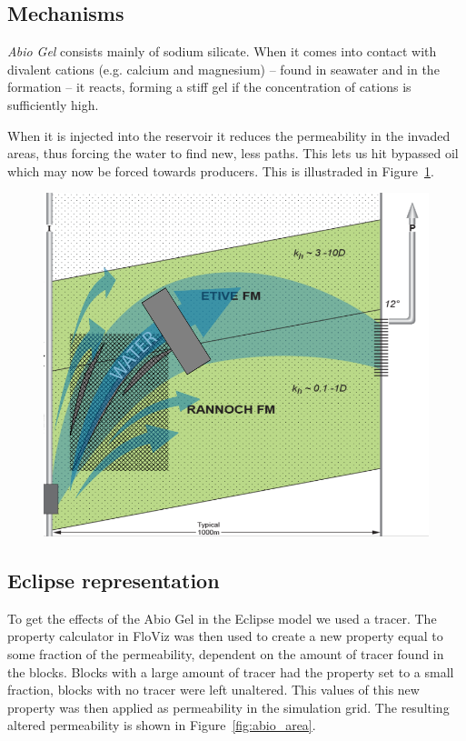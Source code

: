 \documentclass[final]{beamer}
\begin{document}
\begin{frame}[t]
\begin{multicols}{3}
\subsection{Mechanisms} %
\emph{Abio Gel} consists mainly of sodium silicate. When it comes into contact with divalent cations (e.g. calcium and magnesium) -- found in seawater and in the formation -- it reacts, forming a stiff gel if the concentration of cations is sufficiently high.

When it is injected into the reservoir it reduces the permeability in the invaded areas, thus forcing the water to find new, less paths. This lets us hit bypassed oil which may now be forced towards producers. This is illustraded in Figure~\ref{fig:abio_gel}.

\begin{figure}[H]
  \centering
  \includegraphics[width=0.5\columnwidth]{images/abio_gel.png}
  \caption{}
  \label{fig:abio_gel}
\end{figure}



\subsection{Eclipse representation} %
To get the effects of the Abio Gel in the Eclipse model we used a tracer. The property calculator in FloViz was then used to create a new property equal to some fraction of the permeability, dependent on the amount of tracer found in the blocks. Blocks with a large amount of tracer had the property set to a small fraction, blocks with no tracer were left unaltered. This values of this new property was then applied as permeability in the simulation grid. The resulting altered permeability is shown in Figure~\ref{fig:abio_area}.






\end{multicols}
\end{frame}
\end{document}
